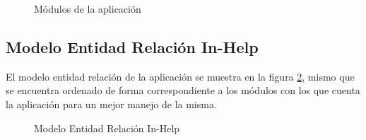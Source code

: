 \begin{figure}[htbp!]
	\centering
	\caption{Módulos de la aplicación}
	\label{fig:MaquetadoelaApp}
\end{figure}

\subsection{Modelo Entidad Relación In-Help}

El modelo entidad relación de la aplicación se muestra en la figura \ref{fig:DB_InHelp}, mismo que se encuentra ordenado de forma correspondiente a los módulos con los que cuenta la aplicación para un mejor manejo de la misma.


\begin{figure}[htbp!]
	\centering
	\caption{Modelo Entidad Relación In-Help}
	\label{fig:DB_InHelp}
\end{figure}

